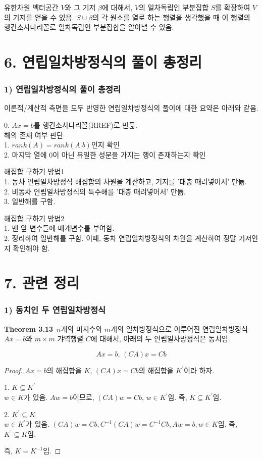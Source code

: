 유한차원 벡터공간 $V$와 그 기저 $\beta$에 대해서, $V$의 일차독립인 부분집합 $S$를 확장하여 $V$의 기저를 얻을 수 있음. $S \cup \beta$의 각 원소를 열로 하는 행렬을 생각했을 때 이 행렬의 행간소사다리꼴로 일차독립인 부분집합을 알아낼 수 있음.\\


\section*{6. 연립일차방정식의 풀이 총정리}
\subsubsection*{1) 연립일차방정식의 풀이 총정리}
이론적/계산적 측면을 모두 반영한 연립일차방정식의 풀이에 대한 요약은 아래와 같음.

0. $Ax=b$를 행간소사다리꼴(RREF)로 만듦.\\

해의 존재 여부 판단\\
1. $rank(A)=rank(A|b)$인지 확인\\
2. 마지막 열에 0이 아닌 유일한 성분을 가지는 행이 존재하는지 확인

해집합 구하기 방법1\\
1. 동차 연립일차방정식 해집합의 차원을 계산하고, 기저를 '대충 때려넣어서' 만듦.\\
2. 비동차 연립일차방정식의 특수해를 '대충 때려넣어서' 만듦.\\
3. 일반해를 구함.

해집합 구하기 방법2\\
1. 맨 앞 변수들에 매개변수를 부여함.\\
2. 정리하여 일반해를 구함. 이때, 동차 연립일차방정식의 차원을 계산하여 정말 기저인지 확인해야 함.


\newpage


\section*{7. 관련 정리}
\subsubsection*{1) 동치인 두 연립일차방정식}
\textbf{Theorem 3.13}\, $n$개의 미지수와 $m$개의 일차방정식으로 이루어진 연립일차방정식 $Ax=b$와 $m \times m$ 갸역행렬 $C$에 대해서, 아래의 두 연립일차방정식은 동치임.

\[
Ax=b,\,(CA)x=Cb
\]

\begin{proof}
$Ax=b$의 해집합을 $K$, $(CA)x=Cb$의 해집합을 $K^{\prime}$이라 하자.

1. $K \subseteq K^{\prime}$\\
$w \in K$가 있음. $Aw=b$이므로, $(CA)w=Cb$, $w \in K^{\prime}$임. 즉, $K \subseteq K^{\prime}$임.

2. $K^{\prime} \subseteq K$\\
$w \in K^{\prime}$가 있음. $(CA)w=Cb, C^{-1}(CA)w=C^{-1}Cb, Aw=b, w \in K$임. 즉, $K^{\prime} \subseteq K$임.

즉, $K=K^{-1}$임.
\end{proof}

